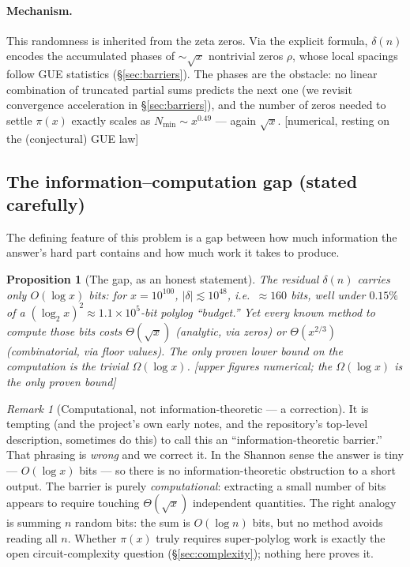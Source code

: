 \documentclass[11pt]{article}
\theoremstyle{plain}
\newtheorem{proposition}[theorem]{Proposition}
\theoremstyle{definition}
\theoremstyle{remark}
\newtheorem{remark}[theorem]{Remark}
\newcommand{\stat}[1]{\quad\textnormal{\footnotesize\textsf{[\textcolor{accent}{#1}]}}}
\begin{document}
\paragraph{Mechanism.}
This randomness is inherited from the zeta zeros. Via the explicit formula,
$\delta(n)$ encodes the accumulated phases of ${\sim}\sqrt{x}$ nontrivial zeros
$\rho$, whose local spacings follow GUE statistics
(\S\ref{sec:barriers}). The phases are the obstacle: no linear combination of
truncated partial sums predicts the next one (we revisit convergence
acceleration in \S\ref{sec:barriers}), and the number of zeros needed to settle
$\pi(x)$ exactly scales as $N_{\min}\sim x^{0.49}$ --- again $\sqrt{x}$.
\stat{numerical, resting on the (conjectural) GUE law}

\subsection{The information--computation gap (stated carefully)}

The defining feature of this problem is a gap between how much information the
answer's hard part contains and how much work it takes to produce.

\begin{proposition}[The gap, as an honest statement]
\label{prop:gap}
The residual $\delta(n)$ carries only $O(\log x)$ bits: for $x=10^{100}$,
$|\delta|\lesssim 10^{48}$, i.e.\ ${\approx}160$ bits, well under $0.15\%$ of a
$(\log_2 x)^2\approx 1.1\times10^5$-bit polylog ``budget.'' Yet every known method
to compute those bits costs $\Theta(\sqrt{x})$ (analytic, via zeros) or
$\Theta(x^{2/3})$ (combinatorial, via floor values). The only \emph{proven}
lower bound on the computation is the trivial $\Omega(\log x)$.
\stat{upper figures numerical; the $\Omega(\log x)$ is the only proven bound}
\end{proposition}

\begin{remark}[Computational, not information-theoretic --- a correction]
\label{rem:correction}
It is tempting (and the project's own early notes, and the repository's
top-level description, sometimes do this) to call this an
``information-theoretic barrier.'' That phrasing is \emph{wrong} and we correct
it. In the Shannon sense the answer is tiny --- $O(\log x)$ bits --- so there is
no information-theoretic obstruction to a short output. The barrier is purely
\emph{computational}: extracting a small number of bits appears to require
touching $\Theta(\sqrt{x})$ independent quantities. The right analogy is summing
$n$ random bits: the sum is $O(\log n)$ bits, but no method avoids reading all
$n$. Whether $\pi(x)$ truly requires super-polylog work is exactly the open
circuit-complexity question (\S\ref{sec:complexity}); nothing here proves it.
\end{remark}
\end{document}
